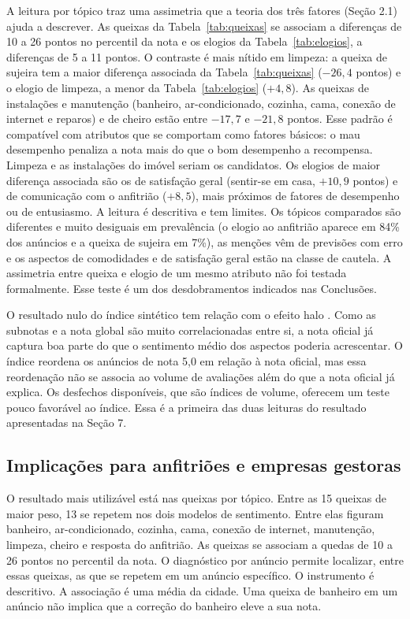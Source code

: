 A leitura por tópico traz uma assimetria que a teoria dos três fatores (Seção 2.1) ajuda a descrever. As queixas da Tabela~\ref{tab:queixas} se associam a diferenças de 10 a 26 pontos no percentil da nota e os elogios da Tabela~\ref{tab:elogios}, a diferenças de 5 a 11 pontos. O contraste é mais nítido em limpeza: a queixa de sujeira tem a maior diferença associada da Tabela~\ref{tab:queixas} ($-26{,}4$ pontos) e o elogio de limpeza, a menor da Tabela~\ref{tab:elogios} ($+4{,}8$). As queixas de instalações e manutenção (banheiro, ar-condicionado, cozinha, cama, conexão de internet e reparos) e de cheiro estão entre $-17{,}7$ e $-21{,}8$ pontos. Esse padrão é compatível com atributos que se comportam como fatores básicos: o mau desempenho penaliza a nota mais do que o bom desempenho a recompensa. Limpeza e as instalações do imóvel seriam os candidatos. Os elogios de maior diferença associada são os de satisfação geral (sentir-se em casa, $+10{,}9$ pontos) e de comunicação com o anfitrião ($+8{,}5$), mais próximos de fatores de desempenho ou de entusiasmo. A leitura é descritiva e tem limites. Os tópicos comparados são diferentes e muito desiguais em prevalência (o elogio ao anfitrião aparece em 84\% dos anúncios e a queixa de sujeira em 7\%), as menções vêm de previsões com erro e os aspectos de comodidades e de satisfação geral estão na classe de cautela. A assimetria entre queixa e elogio de um mesmo atributo não foi testada formalmente. Esse teste é um dos desdobramentos indicados nas Conclusões.

O resultado nulo do índice sintético tem relação com o efeito halo \citep{thorndike1920}. Como as subnotas e a nota global são muito correlacionadas entre si, a nota oficial já captura boa parte do que o sentimento médio dos aspectos poderia acrescentar. O índice reordena os anúncios de nota 5,0 em relação à nota oficial, mas essa reordenação não se associa ao volume de avaliações além do que a nota oficial já explica. Os desfechos disponíveis, que são índices de volume, oferecem um teste pouco favorável ao índice. Essa é a primeira das duas leituras do resultado apresentadas na Seção 7.

\subsection{Implicações para anfitriões e empresas gestoras}

O resultado mais utilizável está nas queixas por tópico. Entre as 15 queixas de maior peso, 13 se repetem nos dois modelos de sentimento. Entre elas figuram banheiro, ar-condicionado, cozinha, cama, conexão de internet, manutenção, limpeza, cheiro e resposta do anfitrião. As queixas se associam a quedas de 10 a 26 pontos no percentil da nota. O diagnóstico por anúncio permite localizar, entre essas queixas, as que se repetem em um anúncio específico. O instrumento é descritivo. A associação é uma média da cidade. Uma queixa de banheiro em um anúncio não implica que a correção do banheiro eleve a sua nota.

